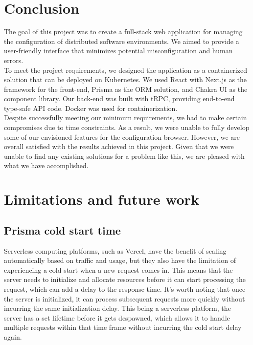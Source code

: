 
\section{Conclusion}



The goal of this project was to create a full-stack web application for managing the configuration of distributed software environments. We aimed to provide a user-friendly interface that minimizes potential misconfiguration and human errors. \\

\noindent
To meet the project requirements, we designed the application as a containerized solution that can be deployed on Kubernetes. We used React with Next.js as the framework for the front-end, Prisma as the ORM solution, and Chakra UI as the component library. Our back-end was built with tRPC, providing end-to-end type-safe API code. Docker was used for containerization. \\

\noindent
Despite successfully meeting our minimum requirements, we had to make certain compromises due to time constraints. As a result, we were unable to fully develop some of our envisioned features for the configuration browser. However, we are overall satisfied with the results achieved in this project. Given that we were unable to find any existing solutions for a problem like this, we are pleased with what we have accomplished. \\

\section{Limitations and future work}

\subsection{Prisma cold start time}

Serverless computing platforms, such as Vercel, have the benefit of scaling automatically based on traffic and usage, but they also have the limitation of experiencing a cold start when a new request comes in. This means that the server needs to initialize and allocate resources before it can start processing the request, which can add a delay to the response time. It's worth noting that once the server is initialized, it can process subsequent requests more quickly without incurring the same initialization delay. This being a serverless platform, the server has a set lifetime before it gets despawned, which allows it to handle multiple requests within that time frame without incurring the cold start delay again. \\

